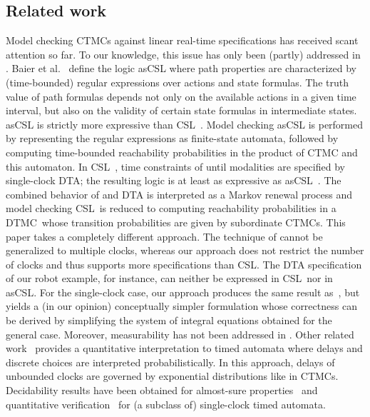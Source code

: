 \documentclass{LMCS}
\newcommand{\<}{\langle}
\renewcommand{\>}{\rangle}
\newcommand{\CSLTA}{\CSL}
\newcommand{\CTMC}{\textsc{{CTMC}}}
\newcommand{\DTA}{\textsc{DTA}}
\newcommand{\DTMC}{\textsc{DTMC}}
\newcommand{\CSL}{\textsc{CSL}}
\begin{document}
\subsection*{Related work}
Model checking CTMCs against linear real-time specifications has received scant attention
so far.
To our knowledge, this issue has only been (partly) addressed in \cite{DHS09,BCHKS07}.
Baier et al.~\cite{BCHKS07} define the logic asCSL where path properties are characterized
by (time-bounded) regular expressions over actions and state formulas.
The truth value of path formulas depends not only on the available actions in a given time
interval, but also on the validity of certain state formulas in intermediate states.
asCSL is strictly more expressive than CSL~\cite{BCHKS07}.
Model checking asCSL is performed by representing the regular expressions as finite-state
automata, followed by computing time-bounded reachability probabilities in the product
of CTMC  and this automaton.
In \CSLTA~\cite{DHS09}, time constraints of until modalities are specified by single-clock
\DTA; the resulting logic is at least as expressive as asCSL~\cite{DHS09}.
The combined behavior of  and DTA  is interpreted as a Markov renewal process
and model checking \CSLTA\ is reduced to computing reachability probabilities in a \DTMC\
whose transition probabilities are given by subordinate \CTMC s.
This paper takes a completely different approach.
The technique of \cite{DHS09} cannot be generalized to multiple clocks, whereas our approach
does not restrict the number of clocks and thus supports more specifications than \CSLTA.
The DTA specification of our robot example, for instance, can neither be expressed in \CSLTA\
nor in asCSL.
For the single-clock case, our approach produces the same result as~\cite{DHS09}, but
yields a (in our opinion) conceptually simpler formulation whose correctness can be
derived by simplifying the system of integral equations obtained for the general case.
Moreover, measurability has not been addressed in \cite{DHS09}.
Other related work~\cite{BBBBG07,BBBBG08,BBBM08} provides a quantitative interpretation
to timed automata where delays and discrete choices are interpreted probabilistically.
In this approach, delays of unbounded clocks are governed by exponential distributions
like in \CTMC s.
Decidability results have been obtained for almost-sure properties~\cite{BBBBG08} and
quantitative verification~\cite{BBBM08} for (a subclass of) single-clock timed automata.
\end{document}
